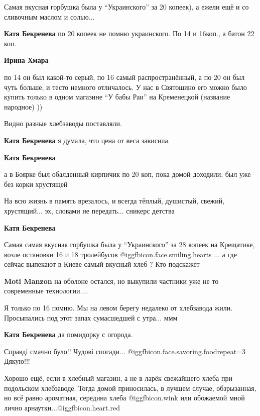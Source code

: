 \begin{itemize}
Самая вкусная горбушка была у \enquote{Украинского} за 20 копеек), а ежели ещё и со сливочным маслом и солью...

\begin{itemize} %
\textbf{Катя Бекренева} по 20 копеек не помню украинского. По 14 и 16коп., а батон 22 коп.

\textbf{Ирина Хмара} 

по 14 он был какой-то серый, по 16 самый распространённый, а по 20 он был чуть
больше, и тесто немного отличалось. У нас в Святошино его можно было купить
только в одном магазине \enquote{У бабы Раи} на Кременецкой (название народное) ))

Видно разные хлебзаводы поставляли.

\textbf{Катя Бекренева} я думала, что цена от веса зависила.

\textbf{Катя Бекренева} 

а в Боярке был обалденный кирпичик по 20 коп, пока домой доходили, был уже без
корки хрустящей

На всю жизнь в память врезалось, и всегда тёплый, душистый, свежий,
хрустящий... эх, словами не передать... сникерс детства

\textbf{Катя Бекренева} 

Самая самая вкусная горбушка была у \enquote{Украинского} за 28 копеек на Крещатике,
возле остановки 16 и 18 тролейбусов  @igg{fbicon.face.smiling.hearts} ... а где сейчас выпекают в Киеве самый
вкусный хлеб ? Кто подскажет

\textbf{Moti Manzon} на оболоне остался, но выкупили частники уже не то современные технологии....


Я только по 16 помню. Мы на левом берегу недалеко от хлебзавода жили.
Просыпались под этот запах сумасшедшей с утра... ммм


\textbf{Катя Бекренева} да помидорку с огорода.

\end{itemize} %

Справді смачно було!! Чудові спогади...
@igg{fbicon.face.savoring.food}{repeat=3}  Дякую!!!


Хорошо ещё, если в хлебный магазин, а не в ларёк свежайшего хлеба при
подольском хлебзаводе. Тогда домой приносилась, в лучшем случае, обзрызанная,
но всё равно ароматная, середина хлеба  @igg{fbicon.wink}  или обожаемой мной
лично арнаутки...@igg{fbicon.heart.red}


\end{itemize}

